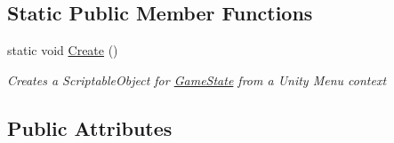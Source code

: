 \subsection*{Static Public Member Functions}
\begin{DoxyCompactItemize}
\item 
static void \hyperlink{class_game_state_a2f3154927e33e16bd595b4aece996c61}{Create} ()
\begin{DoxyCompactList}\small\item\em Creates a Scriptable\-Object for \hyperlink{class_game_state}{Game\-State} from a Unity Menu context \end{DoxyCompactList}\end{DoxyCompactItemize}
\subsection*{Public Attributes}

